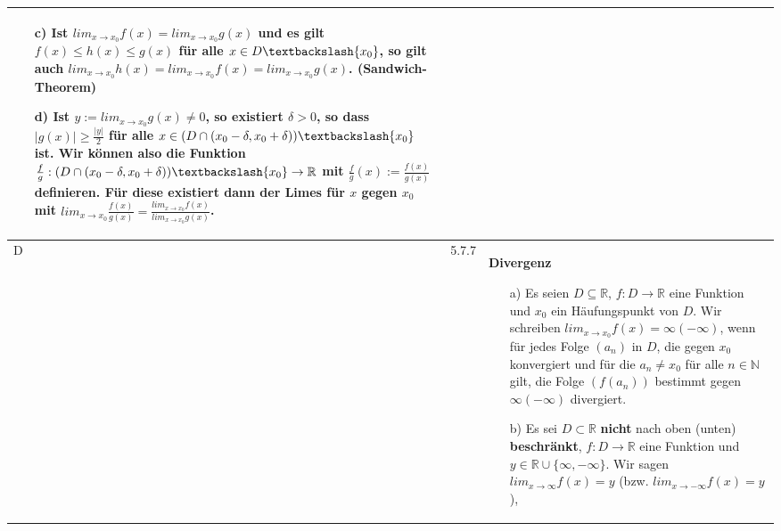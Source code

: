 \begin{longtable}{p{0.75cm} p{1cm} p{16cm}}
\begin{itemize}[topsep=-0.5cm]
                            \item[c)] Ist $lim_{x \rightarrow x_0} f(x) = lim_{x \rightarrow x_0} g(x)$ und es gilt 
                                        $f(x) \leq h(x) \leq g(x)$ für alle $x \in D \textbackslash \{x_0\}$, so gilt auch
                                        $lim_{x \rightarrow x_0} h(x) = lim_{x \rightarrow x_0}f(x) = lim_{x \rightarrow x_0}g(x)$.
                                        (Sandwich-Theorem)
                            \item[d)] Ist $y := lim_{x \rightarrow x_0} g(x) \neq 0$, so existiert $\delta > 0$, so dass
                                        $|g(x)| \geq \frac{|y|}{2}$ für alle $x \in (D \cap (x_0 - \delta, x_0 + \delta)) \textbackslash \{x_0\}$
                                        ist. Wir können also die Funktion $\frac{f}{g}: (D \cap (x_0 - \delta, x_0 + \delta)) \textbackslash \{x_0\}
                                        \rightarrow \mathbb{R}$ mit $\frac{f}{g}(x) := \frac{f(x)}{g(x)}$ definieren. Für diese existiert dann
                                        der Limes für $x$ gegen $x_0$ mit $lim_{x \rightarrow x_0} \frac{f(x)}{g(x)} = 
                                        \frac{lim_{x \rightarrow x_0}f(x)}{lim_{x \rightarrow x_0}g(x)}$.
                        \end{itemize} \vspace{-0cm} \\
        \midrule
        D   & 5.7.7 &   \textbf{Divergenz}
                        \begin{itemize}[topsep=-0.5cm]
                            \item[a)] Es seien $D \subseteq \mathbb{R}$, $f: D \rightarrow \mathbb{R}$ eine Funktion und $x_0$ ein
                                        Häufungspunkt von $D$. Wir schreiben $lim_{x \rightarrow x_0}f(x) = \infty (-\infty)$, wenn
                                        für jedes Folge $(a_n)$ in $D$, die gegen $x_0$ konvergiert und für die $a_n \neq x_0$ für 
                                        alle $n \in \mathbb{N}$ gilt, die Folge $(f(a_n))$ bestimmt gegen $\infty (-\infty)$ divergiert.
                            \item[b)] Es sei $D \subset \mathbb{R}$ \textbf{nicht} nach oben (unten) \textbf{beschränkt}, 
                                        $f : D \rightarrow \mathbb{R}$ eine Funktion und $y \in \mathbb{R} \cup \{\infty,-\infty\}$. 
                                        Wir sagen $lim_{x \rightarrow \infty} f(x) = y$ (bzw. $lim_{x \rightarrow -\infty} f(x) = y$),

\end{itemize}
\end{longtable}
